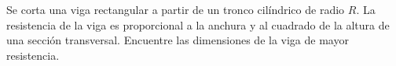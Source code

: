 \item Se corta una viga rectangular a partir de un tronco cilíndrico de radio $R$. La resistencia de la viga es proporcional a la anchura y al cuadrado de la altura de una sección transversal. Encuentre las dimensiones de la viga de mayor resistencia.
